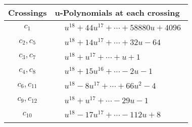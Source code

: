 \documentclass[1p]{elsarticle_modified}
\theoremstyle{definition}
\begin{document}
\begin{tabular}{m{50pt}|m{274pt}}
Crossings & \hspace{64pt}u-Polynomials at each crossing \\
\hline $$\begin{aligned}c_{1}\end{aligned}$$&$\begin{aligned}
&u^{18}+44 u^{17}+\cdots+58880 u+4096
\end{aligned}$\\
\hline $$\begin{aligned}c_{2},c_{5}\end{aligned}$$&$\begin{aligned}
&u^{18}+14 u^{17}+\cdots+32 u-64
\end{aligned}$\\
\hline $$\begin{aligned}c_{3},c_{7}\end{aligned}$$&$\begin{aligned}
&u^{18}+u^{17}+\cdots+u+1
\end{aligned}$\\
\hline $$\begin{aligned}c_{4},c_{8}\end{aligned}$$&$\begin{aligned}
&u^{18}+15 u^{16}+\cdots-2 u-1
\end{aligned}$\\
\hline $$\begin{aligned}c_{6},c_{11}\end{aligned}$$&$\begin{aligned}
&u^{18}-8 u^{17}+\cdots+66 u^2-4
\end{aligned}$\\
\hline $$\begin{aligned}c_{9},c_{12}\end{aligned}$$&$\begin{aligned}
&u^{18}+u^{17}+\cdots-29 u-1
\end{aligned}$\\
\hline $$\begin{aligned}c_{10}\end{aligned}$$&$\begin{aligned}
&u^{18}-17 u^{17}+\cdots-112 u+8
\end{aligned}$\\
\hline
\end{tabular}\\~\\
\newpage\renewcommand{\arraystretch}{1}
\end{document}
